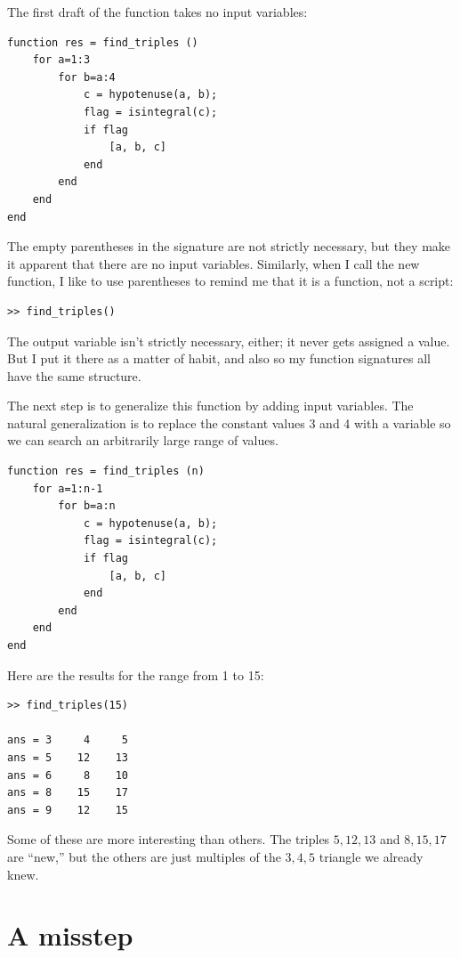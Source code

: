 \documentclass{book}
\begin{document}
The first draft of the function takes no input variables:

\begin{verbatim}
function res = find_triples ()
    for a=1:3
        for b=a:4
            c = hypotenuse(a, b);
            flag = isintegral(c);
            if flag
                [a, b, c]
            end
        end
    end
end
\end{verbatim}

The empty parentheses in the signature are not strictly necessary, but
they make it apparent that there are no input variables.  Similarly,
when I call the new function, I like to use parentheses to remind me
that it is a function, not a script:

\begin{verbatim}
>> find_triples()
\end{verbatim}

The output variable isn't strictly necessary, either; it
never gets assigned a value.  But I put it there as a matter of
habit, and also so my function signatures all have the same structure.

The next step is to generalize this function by adding input
variables.  The natural generalization is to replace the constant
values 3 and 4 with a variable so we can search an arbitrarily large
range of values.

\begin{verbatim}
function res = find_triples (n)
    for a=1:n-1
        for b=a:n
            c = hypotenuse(a, b);
            flag = isintegral(c);
            if flag
                [a, b, c]
            end
        end
    end
end
\end{verbatim}

Here are the results for the range from 1 to 15:

\begin{verbatim}
>> find_triples(15)

ans = 3     4     5
ans = 5    12    13
ans = 6     8    10
ans = 8    15    17
ans = 9    12    15
\end{verbatim}

Some of these are more interesting than others.  The triples
$5,12,13$ and $8,15,17$ are ``new,'' but the others are just
multiples of the $3,4,5$ triangle we already knew.


\section{A misstep}
\end{document}
